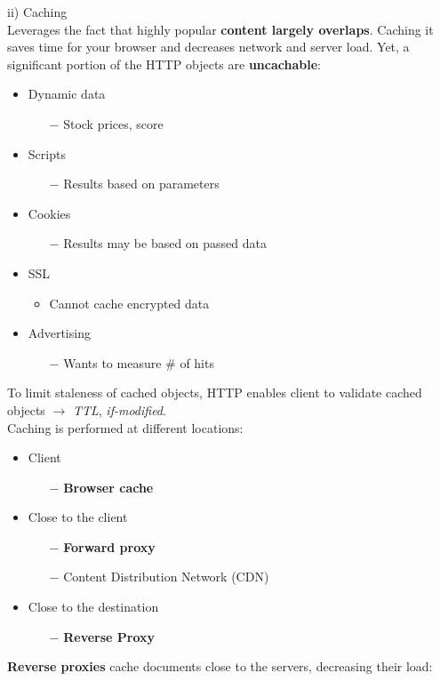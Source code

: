 \documentclass[a4paper, fontsize=8pt, landscape, DIV=1]{scrartcl}
\begin{document}
\begin{multicols*}{4}
		ii) Caching\\
		Leverages the fact that highly popular \textbf{content largely overlaps}.
		Caching it saves time for your browser and decreases network and server load.
		Yet, a significant portion of the HTTP objects are \textbf{uncachable}:
		\begin{itemize}[noitemsep]
			\item Dynamic data
			\begin{itemize}
				\item[$-$] Stock prices, score
			\end{itemize}
			\item Scripts
			\begin{itemize}
				\item[$-$] Results based on parameters
			\end{itemize}
			\item Cookies
			\begin{itemize}
				\item[$-$] Results may be based on passed data
			\end{itemize}
			\item SSL
			\begin{itemize}
				\item Cannot cache encrypted data 
			\end{itemize}
			\item Advertising
			\begin{itemize}
				\item[$-$] Wants to measure \# of hits
			\end{itemize}
		\end{itemize}
		To limit staleness of cached objects, HTTP enables client to validate cached
		objects $\rightarrow$ \textit{TTL}, \textit{if-modified}.\\
		Caching is performed at different locations:
		\begin{itemize}[noitemsep]
			\item Client
			\begin{itemize}
				\item[$-$] \textbf{Browser cache}
			\end{itemize}
			\item Close to the client
			\begin{itemize}
				\item[$-$] \textbf{Forward proxy}
				\item[$-$] Content Distribution Network (CDN)
			\end{itemize}
			\item Close to the destination 
			\begin{itemize}
				\item[$-$] \textbf{Reverse Proxy}
			\end{itemize}
		\end{itemize}
		\textbf{Reverse proxies} cache documents close to the servers, decreasing
		their load:\\
		

\end{multicols*}
\end{document}
